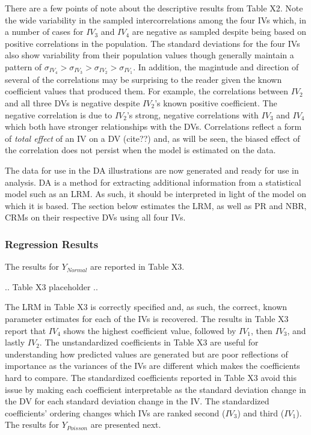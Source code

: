 \documentclass[ShortAfour,times,sageapa]{sagej}
\begin{document}
	There are a few points of note about the descriptive results from Table X2.  
	Note the wide variability in the sampled intercorrelations among the four IVs which, in a number of cases for $IV_3$ and $IV_4$ are negative as sampled despite being based on positive correlations in the population.  
	The standard deviations for the four IVs also show variability from their population values though generally maintain a pattern of $\sigma_{IV_4} > \sigma_{IV_3} > \sigma_{IV_2} > \sigma_{IV_1}$.
	In addition, the magintude and direction of several of the correlations may be surprising to the reader given the known coefficient values that produced them.  
	For example, the correlations between $IV_2$ and all three DVs is negative despite $IV_2$'s known positive coefficient.
	The negative correlation is due to $IV_2$'s strong, negative correlations with $IV_3$ and $IV_4$ which both have stronger relationships with the DVs.
	Correlations reflect a form of \emph{total effect} of an IV on a DV (cite??) and, as will be seen, the biased effect of the correlation does not persist when the model is estimated on the data.
	
	The data for use in the DA illustrations are now generated and ready for use in analysis.
	DA is a method for extracting additional information from a statistical model such as an LRM.
	As such, it should be interpreted in light of the model on which it is based.
	The section below estimates the LRM, as well as PR and NBR, CRMs on their respective DVs using all four IVs.

		\subsubsection{Regression Results}
		
	The results for $Y_{Normal}$ are reported in Table X3.
	
	.. Table X3 placeholder ..
	
	The LRM in Table X3 is correctly specified and, as such, the correct, known parameter estimates for each of the IVs is recovered.
	The results in Table X3 report that $IV_4$ shows the highest coefficient value, followed by $IV_1$, then $IV_3$, and lastly $IV_2$.
	The unstandardized coefficients in Table X3 are useful for understanding how predicted values are generated but are poor reflections of importance as the variances of the IVs are different which makes the coefficients hard to compare.
	The standardized coefficients reported in Table X3 avoid this issue by making each coefficient interpretable as the standard deviation change in the DV for each standard deviation change in the IV.	
	The standardized coefficients' ordering changes which IVs are ranked second ($IV_3$) and third ($IV_1$).  The results for $Y_{Poisson}$ are presented next.
	
\end{document}
